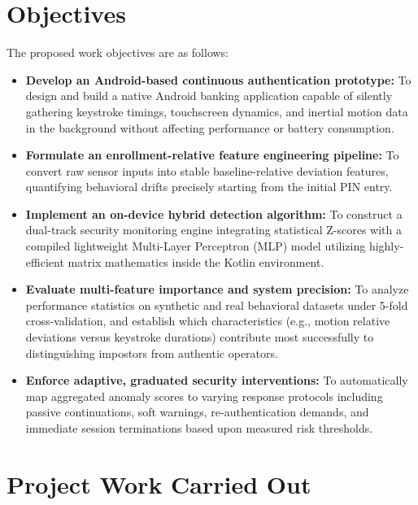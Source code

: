 \documentclass[12pt,a4paper]{report}
\begin{document}
\chapter{Objectives}

The proposed work objectives are as follows:

\begin{itemize}
    \item \textbf{Develop an Android-based continuous authentication prototype:} To design and build a native Android banking application capable of silently gathering keystroke timings, touchscreen dynamics, and inertial motion data in the background without affecting performance or battery consumption.
    \item \textbf{Formulate an enrollment-relative feature engineering pipeline:} To convert raw sensor inputs into stable baseline-relative deviation features, quantifying behavioral drifts precisely starting from the initial PIN entry.
    \item \textbf{Implement an on-device hybrid detection algorithm:} To construct a dual-track security monitoring engine integrating statistical Z-scores with a compiled lightweight Multi-Layer Perceptron (MLP) model utilizing highly-efficient matrix mathematics inside the Kotlin environment.
    \item \textbf{Evaluate multi-feature importance and system precision:} To analyze performance statistics on synthetic and real behavioral datasets under 5-fold cross-validation, and establish which characteristics (e.g., motion relative deviations versus keystroke durations) contribute most successfully to distinguishing impostors from authentic operators.
    \item \textbf{Enforce adaptive, graduated security interventions:} To automatically map aggregated anomaly scores to varying response protocols including passive continuations, soft warnings, re-authentication demands, and immediate session terminations based upon measured risk thresholds.
\end{itemize}

\chapter{Project Work Carried Out}
\end{document}
